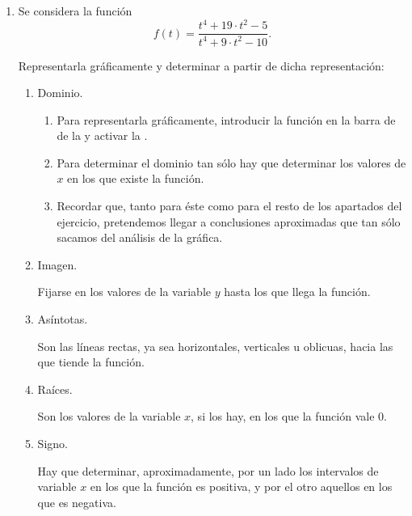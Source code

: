 \begin{enumerate}[leftmargin=*]
\item Se considera la función
      \[
      f(t)=\frac{t^{4} +19\cdot t^{2} - 5}{t^{4} +9\cdot t^{2} - 10}.
      \]

      Representarla gráficamente y determinar a partir de dicha representación:

      \begin{enumerate}
      \item  Dominio.
            \begin{indication}
            \begin{enumerate}
            \item Para representarla gráficamente, introducir la función en la barra de  de la  y activar la .
            \item Para determinar el dominio tan sólo hay que determinar los valores de $x$ en los que existe la función.
            \item Recordar que, tanto para éste como para el resto de los apartados del ejercicio, pretendemos llegar a conclusiones aproximadas que tan sólo sacamos del análisis de la gráfica.
            \end{enumerate}
            \end{indication}

      \item  Imagen.
            \begin{indication}
            Fijarse en los valores de la variable $y$ hasta los que llega la función.
            \end{indication}

      \item  Asíntotas.
            \begin{indication}
            Son las líneas rectas, ya sea horizontales, verticales u oblicuas, hacia las que tiende la función.
            \end{indication}

      \item  Raíces.
            \begin{indication}
            Son los valores de la variable $x$, si los hay, en los que la función vale 0.
            \end{indication}

      \item Signo.
            \begin{indication}
            Hay que determinar, aproximadamente, por un lado los intervalos de variable $x$ en los que la función es positiva, y por el otro aquellos en
            los que es negativa.
            \end{indication}


\end{enumerate}
\end{enumerate}
